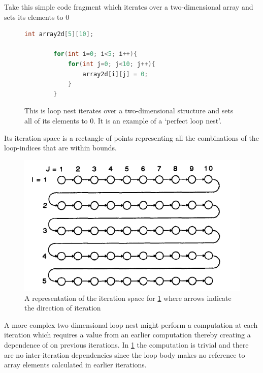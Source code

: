 \documentclass[a4paper,12pt,twoside]{report}
\begin{document}
Take this simple code fragment which iterates over a two-dimensional array and sets its elements to 0
\begin{figure}[h]
    \begin{lstlisting}[language=C]
        int array2d[5][10];

        for(int i=0; i<5; i++){
            for(int j=0; j<10; j++){
                array2d[i][j] = 0;
            }
        }
    \end{lstlisting}
        \caption{
            This is loop nest iterates over a two-dimensional structure and sets all of its elements to 0. It is an example
            of a `perfect loop nest'.
        }
        \label{fig:2dloop}
\end{figure}

Its iteration space is a rectangle of points representing all the combinations of the loop-indices that are within bounds.

\begin{figure}[h]
    \centering
    \includegraphics[scale=0.75]{iteration_space}
    \caption{A representation of the iteration space for \ref{fig:2dloop} where arrows indicate the direction of iteration}
    \label{fig:iteration_space}
\end{figure}

A more complex two-dimensional loop nest might perform a computation at each iteration which requires a value from an earlier
computation thereby creating a dependence of on previous iterations. In \ref{fig:2dloop} the computation is trivial and there are no
inter-iteration dependencies since the loop body makes no reference to array elements calculated in earlier iterations.
\end{document}
